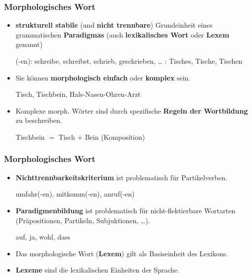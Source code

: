 \begin{frame}
\frametitle{Morphologisches Wort}

\begin{itemize}
	\item \textbf{strukturell stabile} (und \textbf{nicht trennbare}) Grundeinheit eines grammatischen \textbf{Paradigmas} (auch \textbf{lexikalisches Wort} oder \textbf{Lexem} genannt)

	\ea 
		\ea {}(-en): schreibe, schreibst, schrieb, geschrieben, \ldots 
		\ex {}: Tisches, Tische, Tischen
		\z 
	\z 

\pause 
	
	\item Sie können \textbf{morphologisch einfach} oder \textbf{komplex} sein.
	
	\ea Tisch, Tischbein, Hals-Nasen-Ohren-Arzt
	\z 

\pause 
	
	\item Komplexe morph. Wörter sind durch spezifische \textbf{Regeln der Wortbildung} zu beschreiben.
	
	\ea Tischbein $=$ Tisch $+$ Bein (Komposition)
	\z 
\end{itemize}

\end{frame}


\begin{frame}
\frametitle{Morphologisches Wort}

\begin{itemize}
	\item \textbf{Nichttrennbarkeitskriterium} ist problematisch für Partikelverben.
	
	\ea umfahr(-en), mitkomm(-en), anruf(-en)
	\z 
	
	\item \textbf{Paradigmenbildung} ist problematisch für nicht-flektierbare Wortarten (Präpositionen, Partikeln, Subjuktionen, \ldots).
	
	\ea auf, ja, wohl, dass
	\z 
	
	\item Das morphologische Wort (\textbf{Lexem}) gilt als Basiseinheit des Lexikons.
	
	\item \textbf{Lexeme} sind die lexikalischen Einheiten der Sprache.
\end{itemize}

\end{frame}


